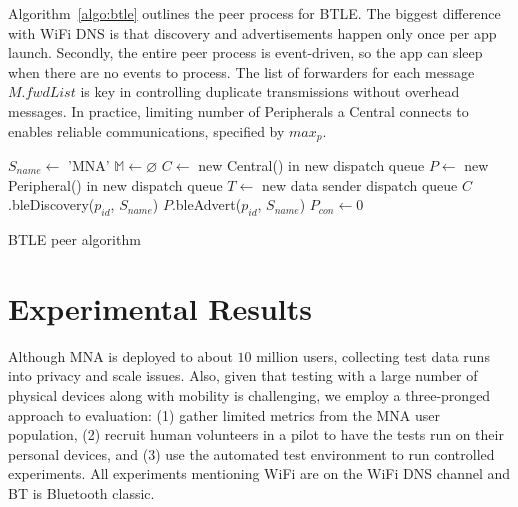 \documentclass[conference]{IEEEtran}
\begin{document}
Algorithm~\ref{algo:btle} outlines the peer process for BTLE. The
biggest difference with WiFi DNS is that discovery and advertisements
happen only once per app launch. Secondly, the entire peer process is
event-driven, so the app can sleep when there are no events to
process. The list of forwarders for each message $M.fwdList$ is key in
controlling duplicate transmissions without overhead messages. In
practice, limiting number of Peripherals a Central connects to enables
reliable communications, specified by $max_p$.

\begin{algorithm}[htb!]
\label{algo:btle}
\DontPrintSemicolon %
\SetAlgoLined
{}
 $S_{name} \gets$ \textsf{'MNA'}\;
 $\mathbb{M} \gets \varnothing$\;
 $C \gets$ new Central() in new dispatch queue\;
 $P \gets$ new Peripheral() in new dispatch queue\;
 $T \gets$ new data sender dispatch queue\;
 $C$.bleDiscovery($p_{id}$, $S_{name}$)\;
 $P$.bleAdvert($p_{id}$, $S_{name}$)\;
 $P_{con} \gets 0$\;





 \caption{BTLE peer algorithm}
\end{algorithm}

%
\section{Experimental Results}
\label{sec:eval}
%
Although MNA is deployed to about $10$ million users, collecting test
data runs into privacy and scale issues. Also, given that testing with
a large number of physical devices along with mobility is challenging,
we employ a three-pronged approach to evaluation: (1) gather limited
metrics from the MNA user population, (2) recruit human volunteers in
a pilot to have the tests run on their personal devices, and (3) use
the automated test environment to run controlled experiments. All
experiments mentioning WiFi are on the WiFi DNS channel and BT is
Bluetooth classic.
%
\end{document}
